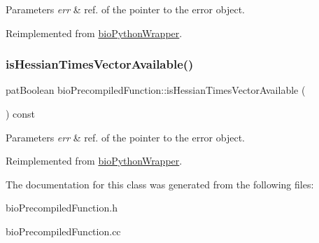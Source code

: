 \begin{DoxyParams}{Parameters}
{\em err} & ref. of the pointer to the error object. \\
\hline
\end{DoxyParams}


Reimplemented from \hyperlink{classbio_python_wrapper_a8dcb20aa1e057667c0feaf3174545fc8}{bio\+Python\+Wrapper}.

\mbox{\label{classbio_precompiled_function_ad29704661602c786841335f8d27795d1}} 
\subsubsection{\texorpdfstring{is\+Hessian\+Times\+Vector\+Available()}{isHessianTimesVectorAvailable()}}
{\footnotesize\ttfamily pat\+Boolean bio\+Precompiled\+Function\+::is\+Hessian\+Times\+Vector\+Available (\begin{DoxyParamCaption}{ }\end{DoxyParamCaption}) const\hspace{0.3cm}{\ttfamily [virtual]}}


\begin{DoxyParams}{Parameters}
{\em err} & ref. of the pointer to the error object. \\
\hline
\end{DoxyParams}


Reimplemented from \hyperlink{classbio_python_wrapper_ad0e9def58fcc08187411ad78ef7314aa}{bio\+Python\+Wrapper}.



The documentation for this class was generated from the following files\+:\begin{DoxyCompactItemize}
\item 
bio\+Precompiled\+Function.\+h\item 
bio\+Precompiled\+Function.\+cc\end{DoxyCompactItemize}
